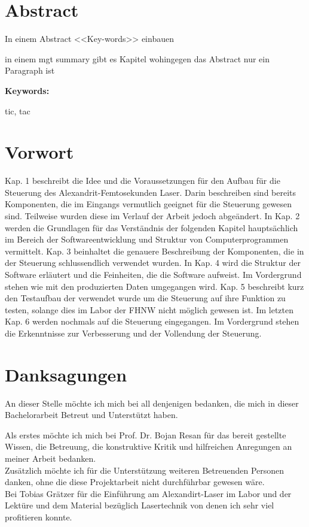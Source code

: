 \section*{Abstract}
In einem Abstract <<Key-words>> einbauen

in einem mgt summary gibt es Kapitel wohingegen das Abstract nur ein Paragraph ist

\vspace{2ex}

\textbf{Keywords:}

tic, tac

\clearpage
\section*{Vorwort}
Kap. 1 beschreibt die Idee und die Voraussetzungen für den Aufbau für die Steuerung des Alexandrit-Femtosekunden Laser. Darin beschreiben sind bereits Komponenten, die im Eingangs vermutlich geeignet für die Steuerung gewesen sind. Teilweise wurden diese im Verlauf der Arbeit jedoch abgeändert. In Kap. 2 werden die Grundlagen für das Verständnis der folgenden Kapitel hauptsächlich im Bereich der Softwareentwicklung und Struktur von Computerprogrammen vermittelt. Kap. 3 beinhaltet die genauere Beschreibung der Komponenten, die in der Steuerung schlussendlich verwendet wurden. In Kap. 4 wird die Struktur der Software erläutert und die Feinheiten, die die Software aufweist. Im Vordergrund stehen wie mit den produzierten Daten umgegangen wird. Kap. 5 beschreibt kurz den Testaufbau der verwendet wurde um die Steuerung auf ihre Funktion zu testen, solange dies im Labor der FHNW nicht möglich gewesen ist. Im letzten Kap. 6 werden nochmals auf die Steuerung eingegangen. Im Vordergrund stehen die Erkenntnisse zur Verbesserung und der Vollendung der Steuerung.

\section*{Danksagungen}
An dieser Stelle möchte ich mich bei all denjenigen bedanken, die mich in dieser Bachelorarbeit Betreut und Unterstützt haben.

Als erstes möchte ich mich bei Prof. Dr. Bojan Resan für das bereit gestellte Wissen, die Betreuung, die konstruktive Kritik und hilfreichen Anregungen an meiner Arbeit bedanken.\\

Zusätzlich möchte ich für die Unterstützung weiteren Betreuenden Personen danken, ohne die diese Projektarbeit nicht durchführbar gewesen wäre.\\ Bei Tobias Grätzer für die Einführung am Alexandirt-Laser im Labor und der Lektüre und dem Material bezüglich Lasertechnik von denen ich sehr viel profitieren konnte.

